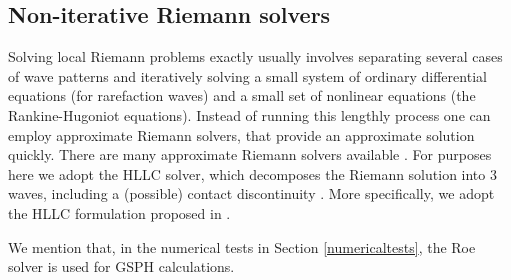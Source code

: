 \documentclass[review]{elsarticle}
\begin{document}
\subsection{Non-iterative Riemann solvers} \label{sec:RP-solver}
Solving local Riemann problems exactly usually involves separating 
several cases of wave patterns and iteratively solving a small system of ordinary differential
equations (for rarefaction waves) and a small set of nonlinear equations (the Rankine-Hugoniot equations). Instead of running this lengthly process one can employ approximate Riemann solvers, that provide an approximate solution quickly. 
There are many approximate Riemann solvers available 
\citep{rider1994review, luo2004computation, puri2014approximate}. For purposes here
we adopt the HLLC solver, which decomposes the Riemann solution into 3 waves, including a (possible) contact discontinuity
 \citet{toro1994restoration}. More specifically, we adopt the HLLC formulation proposed in \citet{luo2004computation}.
 
 We mention that, in the numerical tests in Section \ref{numericaltests}, 
 the Roe solver is used for GSPH calculations.
\end{document}
